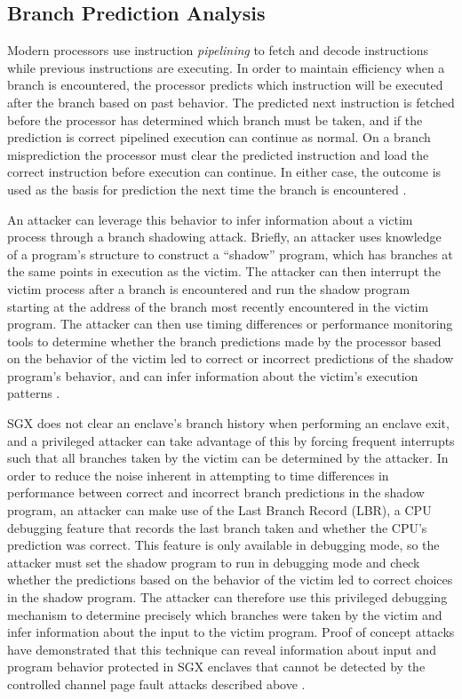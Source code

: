 \subsection{Branch Prediction Analysis}

Modern processors use instruction \emph{pipelining} to fetch and decode instructions while previous instructions are executing. In order to maintain efficiency when a branch is encountered, the processor predicts which instruction will be executed after the branch based on past behavior. The predicted next instruction is fetched before the processor has determined which branch must be taken, and if the prediction is correct pipelined execution can continue as normal. On a branch misprediction the processor must clear the predicted instruction and load the correct instruction before execution can continue. In either case, the outcome is used as the basis for prediction the next time the branch is encountered \cite{aciicmez_power_2007, lee_inferring_2017}. 

An attacker can leverage this behavior to infer information about a victim process through a branch shadowing attack. Briefly, an attacker uses knowledge of a program's structure to construct a ``shadow'' program, which has branches at the same points in execution as the victim. The attacker can then interrupt the victim process after a branch is encountered and run the shadow program starting at the address of the branch most recently encountered in the victim program. The attacker can then use timing differences or performance monitoring tools to determine whether the branch predictions made by the processor based on the behavior of the victim led to correct or incorrect predictions of the shadow program's behavior, and can infer information about the victim's execution patterns \cite{lee_inferring_2017}.

SGX does not clear an enclave's branch history when performing an enclave exit, and a privileged attacker can take advantage of this by forcing frequent interrupts such that all branches taken by the victim can be determined by the attacker. In order to reduce the noise inherent in attempting to time differences in performance between correct and incorrect branch predictions in the shadow program, an attacker can make use of the Last Branch Record (LBR), a CPU debugging feature that records the last branch taken and whether the CPU's prediction was correct. This feature is only available in debugging mode, so the attacker must set the shadow program to run in debugging mode and check whether the predictions based on the behavior of the victim led to correct choices in the shadow program. The attacker can therefore use this privileged debugging mechanism to determine precisely which branches were taken by the victim and infer information about the input to the victim program. Proof of concept attacks have demonstrated that this technique can reveal information about input and program behavior protected in SGX enclaves that cannot be detected by the controlled channel page fault attacks described above \cite{lee_inferring_2017, shinde_preventing_2015}. 

